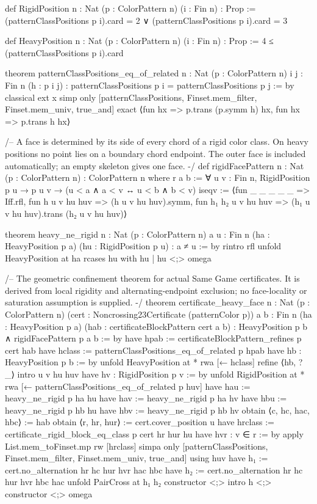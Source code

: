 \documentclass[11pt,reqno]{amsart}
\theoremstyle{definition}
\begin{document}
\begin{LeanCode}
def RigidPosition {n : Nat} (p : ColorPattern n) (i : Fin n) : Prop :=
  (patternClassPositions p i).card = 2 ∨ (patternClassPositions p i).card = 3

def HeavyPosition {n : Nat} (p : ColorPattern n) (i : Fin n) : Prop :=
  4 ≤ (patternClassPositions p i).card

theorem patternClassPositions_eq_of_related {n : Nat} (p : ColorPattern n)
    {i j : Fin n} (h : p i j) :
    patternClassPositions p i = patternClassPositions p j := by
  classical
  ext x
  simp only [patternClassPositions, Finset.mem_filter, Finset.mem_univ, true_and]
  exact ⟨fun hx => p.trans (p.symm h) hx, fun hx => p.trans h hx⟩

/-- A face is determined by its side of every chord of a rigid color class.
On heavy positions no point lies on a boundary chord endpoint. The outer
face is included automatically; an empty skeleton gives one face. -/
def rigidFacePattern {n : Nat} (p : ColorPattern n) : ColorPattern n where
  r a b := ∀ u v : Fin n, RigidPosition p u → p u v →
    (u < a ∧ a < v ↔ u < b ∧ b < v)
  iseqv := ⟨fun _ _ _ _ _ => Iff.rfl,
    fun h u v hu huv => (h u v hu huv).symm,
    fun h₁ h₂ u v hu huv => (h₁ u v hu huv).trans (h₂ u v hu huv)⟩

theorem heavy_ne_rigid {n : Nat} (p : ColorPattern n) {a u : Fin n}
    (ha : HeavyPosition p a) (hu : RigidPosition p u) : a ≠ u := by
  rintro rfl
  unfold HeavyPosition at ha
  rcases hu with hu | hu <;> omega

/-- The geometric confinement theorem for actual Same Game certificates.
It is derived from local rigidity and alternating-endpoint exclusion;
no face-locality or saturation assumption is supplied. -/
theorem certificate_heavy_face {n : Nat} (p : ColorPattern n)
    (cert : Noncrossing23Certificate (patternColor p))
    {a b : Fin n} (ha : HeavyPosition p a)
    (hab : certificateBlockPattern cert a b) :
    HeavyPosition p b ∧ rigidFacePattern p a b := by
  have hpab := certificateBlockPattern_refines p cert hab
  have hclass := patternClassPositions_eq_of_related p hpab
  have hb : HeavyPosition p b := by
    unfold HeavyPosition at *
    rwa [← hclass]
  refine ⟨hb, ?_⟩
  intro u v hu huv
  have hv : RigidPosition p v := by
    unfold RigidPosition at *
    rwa [← patternClassPositions_eq_of_related p huv]
  have hau := heavy_ne_rigid p ha hu
  have hav := heavy_ne_rigid p ha hv
  have hbu := heavy_ne_rigid p hb hu
  have hbv := heavy_ne_rigid p hb hv
  obtain ⟨c, hc, hac, hbc⟩ := hab
  obtain ⟨r, hr, hur⟩ := cert.cover_position u
  have hrclass := certificate_rigid_block_eq_class p cert hr hur hu
  have hvr : v ∈ r := by
    apply List.mem_toFinset.mp
    rw [hrclass]
    simpa only [patternClassPositions, Finset.mem_filter,
      Finset.mem_univ, true_and] using huv
  have h₁ := cert.no_alternation hr hc hur hvr hac hbc
  have h₂ := cert.no_alternation hr hc hur hvr hbc hac
  unfold PairCross at h₁ h₂
  constructor <;> intro h <;> constructor <;> omega


\end{LeanCode}
\end{document}
